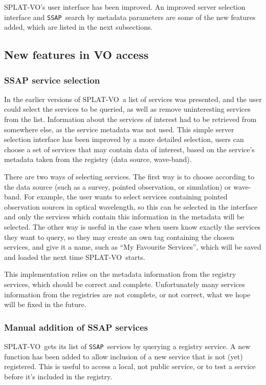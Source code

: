 \documentclass[final,authoryear,5p,times,twocolumn]{elsarticle}
\newcommand{\ssap}{\texttt{SSAP}}
\newcommand{\splatvo}{{\textsf{\small{SPLAT-VO}}}}
\begin{document}
\splatvo's user interface has been improved. An improved server selection
interface and \ssap\ search by metadata parameters are some of the new features
added, which are listed in the next subsections.

\subsection{New features in VO access}
%
\subsubsection{SSAP service selection}
%
In the earlier versions of \splatvo\ a list of services was presented, and the
user could select the services to be queried, as well as remove uninteresting
services from the list. Information about the services of interest had to be
retrieved from somewhere else, as the service metadata was not used.  This
simple server selection interface has been improved by a more detailed
selection, users can choose a set of services that may contain data of
interest, based on the service's metadata taken from the registry (data source,
wave-band).

There are two ways of selecting services. The first way is to choose according
to the data source (such as a survey, pointed observation, or simulation) or
wave-band.  For example, the user wants to select services containing pointed
observation sources in optical wavelength, so this can be selected in the
interface and only the services which contain this information in the metadata
will be selected.  The other way is useful in the case when users know exactly
the services they want to query, so they may create an own tag containing the
chosen services, and give it a name, such as ``My Favourite Services'', which
will be saved and loaded the next time \splatvo\ starts.

This implementation relies on the metadata information from the registry
services, which should be correct and complete. Unfortunately many services
information from the registries are not complete, or not correct, what we hope
will be fixed in the future.

\subsubsection{Manual addition of SSAP services}
%
\splatvo\ gets its list of \ssap\ services by querying a registry service.  A
new function has been added to allow inclusion of a new service that is not
(yet) registered. This is useful to access a local, not public service, or to
test a service before it's included in the registry.
\end{document}
